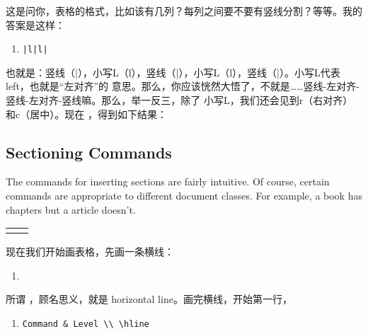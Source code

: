 这是问你，表格的格式，比如该有几列？每列之间要不要有竖线分割？等等。我的答案是这样：

\begin{enumerate}
\item[] \texttt{|l|l|}
\end{enumerate}

也就是：竖线（|），小写L（l），竖线（|），小写L（l），竖线（|）。小写L代表 left，也就是“左对齐”的
意思。那么，你应该恍然大悟了，不就是……竖线-左对齐-竖线-左对齐-竖线嘛。那么，举一反三，除了
小写L，我们还会见到r（右对齐）和c（居中）。现在 ，得到如下结果：

\begin{codeblock}[.9]
\begin{latexcode}
 
  \subsection{Sectioning Commands}
  \label{sec:sectioning-commands}
  
  The commands for inserting sections are fairly intuitive.
  Of course, certain commands are appropriate to different
  document classes. For example, a book has chapters but a
  article doesn't.
  

  \begin{center}
    \begin{tabular}{|l|l|}
      &
    \end{tabular}
  \end{center}
\end{latexcode}
\end{codeblock}

现在我们开始画表格，先画一条横线：

\begin{enumerate}
\item[] \ltx{\hline} 
\end{enumerate}

所谓 \ltx{\hline} ，顾名思义，就是 horizontal line。画完横线，开始第一行，

\begin{enumerate}
\item[] \verb'Command & Level \\ \hline' 
\end{enumerate}

